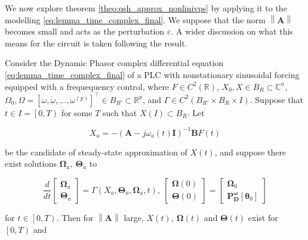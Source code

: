 	We now explore theorem \ref{theo:qsh_approx_nonlinivps} by applying it to the modelling \ref{eq:lemma_time_complex_final}. We suppose that the norm $\left\lVert \mathbf{A}\right\rVert$ becomes small and acts as the perturbation $\varepsilon$. A wider discussion on what this means for the circuit is taken following the result.

\begin{theorem}\label{theo:qsh_linear_circuits}%
	Consider the Dynamic Phasor complex differential equation \eqref{eq:lemma_time_complex_final} of a PLC with nonstationary sinusoidal forcing equipped with a frequequency control, where $F\in C^2\left(\mathbb{R}\right)$, $X_0,X\in B_R\subset \mathbb{C}^n$, $\Omega_0,\Omega = \left[\omega,\dot{\omega},...,\omega^{(p)}\right]^\intercal \in B_{R'}\subset\mathbb{R}^p$, and $\Gamma \in C^2\left(B_{R'}\times B_R \times I\right)$. Suppose that $t\in I = \left[0,T\right)$ for some $T$ such that $X(I)\subset B_{R}$. Let 

\begin{equation} X_a = -\left(\mathbf{A} - j\omega_a(t)\mathbf{I}\right)^{-1}\mathbf{B}F(t) \end{equation}

	\noindent be the candidate of steady-state approximation of $X(t)$, and suppose there exist solutions $\boldsymbol{\Omega}_a,\ \boldsymbol{\Theta}_a$ to

\begin{equation} \dfrac{d}{dt}\left[\begin{array}{c} \boldsymbol{\Omega}_a \\[3mm] \boldsymbol{\Theta}_a\end{array}\right] = \Gamma \left(X_a, \boldsymbol{\Theta}_a, \boldsymbol{\Omega}_a, t\right),\ \left[\begin{array}{c} \boldsymbol{\Omega}(0) \\[3mm] \boldsymbol{\Theta}(0) \end{array}\right] = \left[\begin{array}{c} \boldsymbol{\Omega}_0 \\[3mm] \mathbf{P_D^\omega}\left[\boldsymbol{\theta}_0\right] \end{array}\right] \label{eq:theo_slowfast_omegaa_def}\end{equation}

	for $t\in\left[0,T\right)$. Then for $\left\lVert \mathbf{A}\right\rVert$ large, $X(t),\ \boldsymbol{\Omega}(t)$ and $\boldsymbol{\Theta}(t)$ exist for $\left[0,T\right)$ and


\end{theorem}
